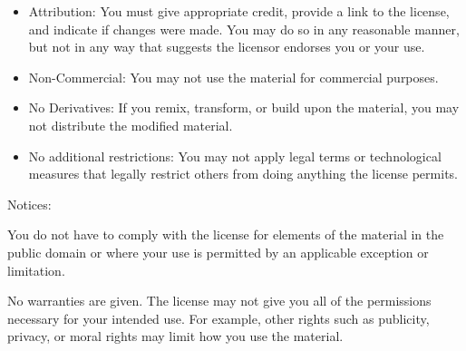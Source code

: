 \documentclass[11pt,openany]{memoir}
\begin{document}
\begin{itemize}
\item Attribution: You must give appropriate credit, provide a link to 
the
license, and indicate if changes were made. You may do so in any
reasonable manner, but not in any way that suggests the licensor
endorses you or your use. 

\item Non-Commercial: You may not use the material for commercial 
purposes.

\item No Derivatives: If you remix, transform, or build upon the
material, you may not distribute the modified material.

\item No additional restrictions: You may not apply legal terms or
technological measures that legally restrict others from doing anything
the license permits.
\end{itemize}

Notices:

You do not have to comply with the license for elements of the material
in the public domain or where your use is permitted by an applicable
exception or limitation.

No warranties are given. The license may not give you all of the
permissions necessary for your intended use. For example, other rights
such as publicity, privacy, or moral rights may limit how you use the
material. 

\end{document}
